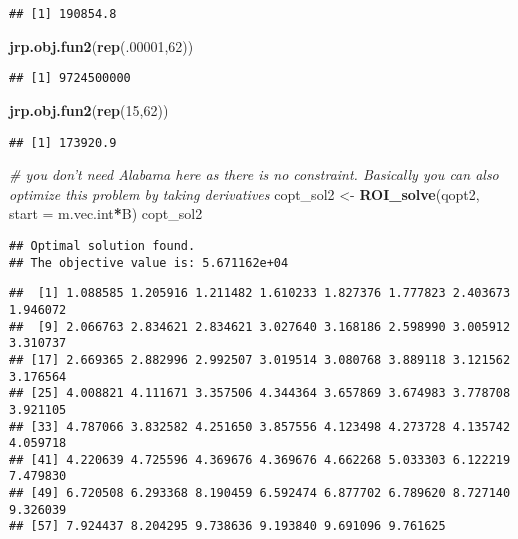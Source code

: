 \documentclass[
]{article}
\newenvironment{Shaded}{\begin{snugshade}}{\end{snugshade}}
\newcommand{\CommentTok}[1]{\textcolor[rgb]{0.56,0.35,0.01}{\textit{#1}}}
\newcommand{\DataTypeTok}[1]{\textcolor[rgb]{0.13,0.29,0.53}{#1}}
\newcommand{\DecValTok}[1]{\textcolor[rgb]{0.00,0.00,0.81}{#1}}
\newcommand{\KeywordTok}[1]{\textcolor[rgb]{0.13,0.29,0.53}{\textbf{#1}}}
\newcommand{\NormalTok}[1]{#1}
\newcommand{\OperatorTok}[1]{\textcolor[rgb]{0.81,0.36,0.00}{\textbf{#1}}}
\newcommand{\StringTok}[1]{\textcolor[rgb]{0.31,0.60,0.02}{#1}}
\begin{document}
\begin{verbatim}
## [1] 190854.8
\end{verbatim}

\begin{Shaded}
\begin{Highlighting}[]
\KeywordTok{jrp.obj.fun2}\NormalTok{(}\KeywordTok{rep}\NormalTok{(.}\DecValTok{00001}\NormalTok{,}\DecValTok{62}\NormalTok{))}
\end{Highlighting}
\end{Shaded}

\begin{verbatim}
## [1] 9724500000
\end{verbatim}

\begin{Shaded}
\begin{Highlighting}[]
\KeywordTok{jrp.obj.fun2}\NormalTok{(}\KeywordTok{rep}\NormalTok{(}\DecValTok{15}\NormalTok{,}\DecValTok{62}\NormalTok{))}
\end{Highlighting}
\end{Shaded}

\begin{verbatim}
## [1] 173920.9
\end{verbatim}

\begin{Shaded}
\begin{Highlighting}[]
\CommentTok{# you don't need Alabama here as there is no constraint. Basically you can also optimize this problem by taking derivatives}
\NormalTok{copt_sol2 <-}\StringTok{ }\KeywordTok{ROI_solve}\NormalTok{(qopt2, }\DataTypeTok{start =}\NormalTok{ m.vec.int}\OperatorTok{*}\NormalTok{B)}
\NormalTok{copt_sol2}
\end{Highlighting}
\end{Shaded}

\begin{verbatim}
## Optimal solution found.
## The objective value is: 5.671162e+04
\end{verbatim}

\begin{Shaded}
\end{Shaded}

\begin{verbatim}
##  [1] 1.088585 1.205916 1.211482 1.610233 1.827376 1.777823 2.403673 1.946072
##  [9] 2.066763 2.834621 2.834621 3.027640 3.168186 2.598990 3.005912 3.310737
## [17] 2.669365 2.882996 2.992507 3.019514 3.080768 3.889118 3.121562 3.176564
## [25] 4.008821 4.111671 3.357506 4.344364 3.657869 3.674983 3.778708 3.921105
## [33] 4.787066 3.832582 4.251650 3.857556 4.123498 4.273728 4.135742 4.059718
## [41] 4.220639 4.725596 4.369676 4.369676 4.662268 5.033303 6.122219 7.479830
## [49] 6.720508 6.293368 8.190459 6.592474 6.877702 6.789620 8.727140 9.326039
## [57] 7.924437 8.204295 9.738636 9.193840 9.691096 9.761625
\end{verbatim}
\end{document}

